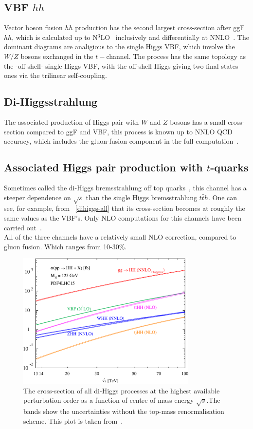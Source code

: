 \subsection{VBF $hh$}
Vector boson fusion $hh$ production has the second largest cross-section after ggF $hh$, which is calculated up to N$^3$LO~\cite{Baglio:2012np,Ling:2014sne,Dreyer:2018qbw} inclusively and differentially at NNLO~\cite{Dreyer:2018rfu}. The dominant diagrams are analigious to the single Higgs VBF, which involve the $W/Z$ bosons exchanged in the $t-$channel. The process has the same topology as the -off shell- single Higgs VBF, with the off-shell Higgs giving two final states ones via the trilinear self-coupling. 
\subsection{Di-Higgsstrahlung}
The associated production of Higgs pair with $W$ and $Z$ bosons has a small cross-section compared to ggF and VBF,  this process is known up to NNLO QCD accuracy, which includes the gluon-fusion component in the full computation~\cite{aglio:2012np,Li:2016nrr,Li:2017lbf}. 
\subsection{Associated Higgs pair production with $t$-quarks}
Sometimes called the di-Higgs bremsstrahlung off top quarks~\cite{DiMicco:2019ngk}, this channel has a steeper dependence on $\sqrt{s}$ than the single Higgs bremsstrahlung $t\bar t h$. One can see, for example, from ~\autoref{dihiggs-all} that its cross-section becomes at  roughly the same  values as the VBF's. Only NLO computations for this channels have been carried out~\cite{Frederix:2014hta}. \\ All of the three channels have a relatively small NLO correction, compared to gluon fusion. Which ranges from 10-30\%. 
\begin{figure}[!htpb]
	\centering
	\includegraphics[width = 0.8\textwidth]{./figures/cxn_HH}
	\caption{The cross-section of all di-Higgs processes at the highest available perturbation order as a function of centre-of-mass energy $\sqrt{s}$.The bands show the uncertainties without the top-mass renormalisation scheme. This plot is taken from~\cite{DiMicco:2019ngk}.} 
	\label{dihiggs-all}
\end{figure}
%

